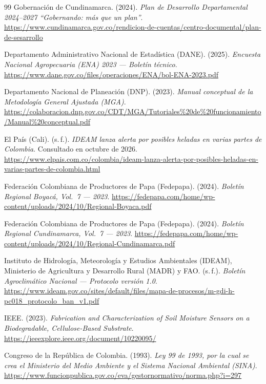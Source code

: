 \documentclass[11pt,a4paper]{article}
\begin{document}
\begin{thebibliography}{99}
 Gobernación de Cundinamarca. (2024). \textit{Plan de Desarrollo Departamental 2024--2027 ``Gobernando: más que un plan''}. \url{https://www.cundinamarca.gov.co/rendicion-de-cuentas/centro-documental/plan-de-sesarrollo}

 Departamento Administrativo Nacional de Estadística (DANE). (2025). \textit{Encuesta Nacional Agropecuaria (ENA) 2023 --- Boletín técnico}. \url{https://www.dane.gov.co/files/operaciones/ENA/bol-ENA-2023.pdf}

 Departamento Nacional de Planeación (DNP). (2023). \textit{Manual conceptual de la Metodología General Ajustada (MGA)}. \url{https://colaboracion.dnp.gov.co/CDT/MGA/Tutoriales%20de%20funcionamiento/Manual%20conceptual.pdf}

 El País (Cali). (s.\,f.). \textit{IDEAM lanza alerta por posibles heladas en varias partes de Colombia}. Consultado en octubre de 2026. \url{https://www.elpais.com.co/colombia/ideam-lanza-alerta-por-posibles-heladas-en-varias-partes-de-colombia.html}

 Federación Colombiana de Productores de Papa (Fedepapa). (2024). \textit{Boletín Regional Boyacá, Vol.\ 7 --- 2023}. \url{https://fedepapa.com/home/wp-content/uploads/2024/10/Regional-Boyaca.pdf}

 Federación Colombiana de Productores de Papa (Fedepapa). (2024). \textit{Boletín Regional Cundinamarca, Vol.\ 7 --- 2023}. \url{https://fedepapa.com/home/wp-content/uploads/2024/10/Regional-Cundinamarca.pdf}

 Instituto de Hidrología, Meteorología y Estudios Ambientales (IDEAM), Ministerio de Agricultura y Desarrollo Rural (MADR) y FAO. (s.\,f.). \textit{Boletín Agroclimático Nacional --- Protocolo versión 1.0}. \url{https://www.ideam.gov.co/sites/default/files/mapa-de-procesos/m-gdi-h-pc018_protocolo_ban_v1.pdf}

 IEEE. (2023). \textit{Fabrication and Characterization of Soil Moisture Sensors on a Biodegradable, Cellulose-Based Substrate}. \url{https://ieeexplore.ieee.org/document/10220095/}

 Congreso de la República de Colombia. (1993). \textit{Ley 99 de 1993, por la cual se crea el Ministerio del Medio Ambiente y el Sistema Nacional Ambiental (SINA)}. \url{https://www.funcionpublica.gov.co/eva/gestornormativo/norma.php?i=297}


\end{thebibliography}
\end{document}
